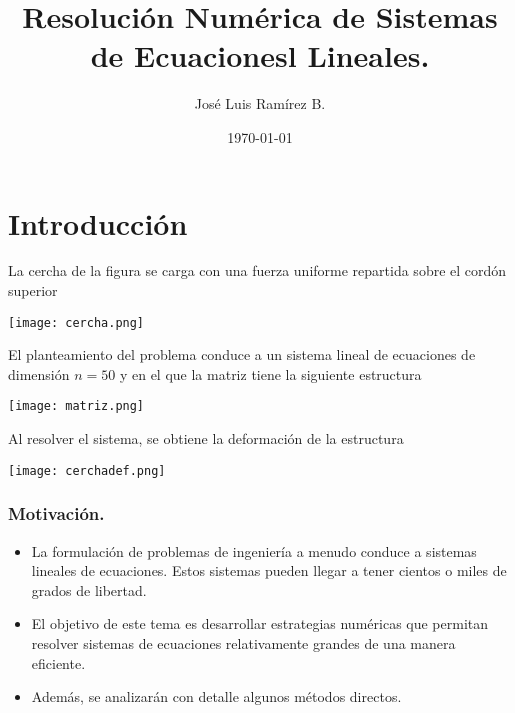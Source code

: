 \documentclass{beamer}
\title{Resoluci\'on Num\'erica de Sistemas de Ecuacionesl Lineales.}
\author{Jos\'e Luis Ram\'irez B.}
\date{\today}
\begin{document}
\frame{\titlepage}

\frame{\tableofcontents}

\section{Introducci\'on}
\begin{frame}[fragile]
 La cercha de la figura se carga con una fuerza uniforme repartida sobre el cord\'on superior

 \begin{center}
 \texttt{[image: cercha.png]}
\end{center}

 El planteamiento del problema conduce a un sistema lineal de ecuaciones de dimensi\'on $n=50$ y en el que la matriz tiene la siguiente estructura

 \begin{center}
 \texttt{[image: matriz.png]}
\end{center}
 
 Al resolver el sistema, se obtiene la deformaci\'on de la estructura
 
 \begin{center}
 \texttt{[image: cerchadef.png]}
\end{center}
 
\end{frame}
\frame
{
  \frametitle{Motivaci\'on.} 
  \begin{itemize}
   \item<1->La formulaci\'on de problemas de ingenier\'ia a menudo conduce a sistemas lineales de ecuaciones. Estos sistemas pueden llegar a tener cientos o miles de grados de libertad. 
   \item<2-> El objetivo de este tema es desarrollar estrategias num\'ericas que permitan resolver sistemas de ecuaciones relativamente grandes de una manera eficiente. 
   \item<3-> Adem\'as, se analizar\'an con detalle algunos m\'etodos directos.
  \end{itemize}
}
\frame
\end{document}

